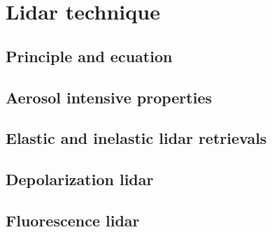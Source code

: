 \chapter{Lidar technique}
\label{sect::sota_chapter6}

\section{Principle and ecuation}

\section{Aerosol intensive properties}

\section{Elastic and inelastic lidar retrievals}

\section{Depolarization lidar}

\section{Fluorescence lidar}

